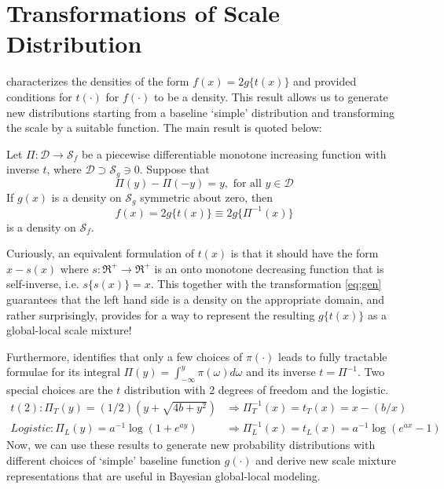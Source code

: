 \documentclass[letterpaper,11pt]{article}
\begin{document}
\section{Transformations of Scale Distribution} 

\cite{jones2014generating} characterizes the densities of the form $f(x) = 2g\{ t(x) \}$ and provided conditions for $t(\cdot)$ for $f(\cdot)$ to be a density. This result allows us to generate new distributions starting from a baseline `simple' distribution and transforming the scale by a suitable function. The main result is quoted below: 
\begin{proposition}\label{prop:jones}
Let $\Pi: \mathcal{D} \to \mathcal{S}_{f}$ be a piecewise differentiable monotone increasing function with inverse $t$, where $\mathcal{D} \supset \mathcal{S}_{g} \ni 0$. Suppose that 
$$
\Pi(y) - \Pi(-y) = y, \text{ for all } y \in \mathcal{D}
$$
If $g(x)$ is a density on $\mathcal{S}_{g}$ symmetric about zero, then 
$$
f(x) = 2g \{ t(x) \} \equiv 2g \{ \Pi^{-1}(x) \}
$$
 is a density on $\mathcal{S}_{f}$.
\end{proposition}
Curiously, an equivalent formulation of $t(x)$ is that it should have the form $x-s(x)$ where $s : \Re^+ \to \Re^+$ is an onto monotone decreasing function that is self-inverse, i.e. $s\{ s(x)\} = x$. This together with the \CS transformation \eqref{eq:gen} guarantees that the left hand side is a density on the appropriate domain, and rather surprisingly, provides for a way to represent the resulting $g\{t(x)\}$ as a global-local scale mixture! 
 
Furthermore, \cite{jones2014generating} identifies that only a few choices of $\pi(\cdot)$ leads to fully tractable formulae for its integral $\Pi(y) = \int_{-\infty}^{y} \pi(\omega) d\omega$ and its inverse $t = \Pi^{-1}$. Two special choices are the $t$ distribution with 2 degrees of freedom and the logistic. 
\begin{align}
t(2): \Pi_{T}(y) = (1/2)(y+\sqrt{4b+y^2}) & \Rightarrow \Pi_T^{-1}(x) = t_T(x) = x - (b/x) \\
Logistic: \Pi_{L}(y) = a^{-1} \log(1+e^{ay}) & \Rightarrow \Pi_L^{-1}(x) = t_L(x) = a^{-1} \log(e^{ax}-1) 
\end{align}
Now, we can use these results to generate new probability distributions with different choices of `simple' baseline function $g(\cdot)$ and derive new scale mixture representations that are useful in Bayesian global-local modeling. 

\end{document}
